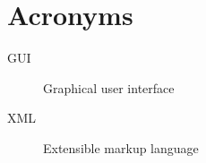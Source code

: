 \chapter{Acronyms}\label{ch:acronyms}
\begin{description}
	\item[GUI] Graphical user interface
	\item[XML] Extensible markup language
\end{description}
